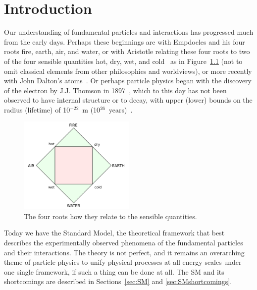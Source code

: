 
\chapter{Introduction\label{ch:intro}}

Our understanding of fundamental particles and interactions has progressed much from the early days.
Perhaps these beginnings are with Empdocles and his four roots fire, earth, air, and water, or with
Aristotle relating these four roots to two of the four sensible quantities hot, dry, wet, and
cold~\cite{0415078547} as in Figure~\ref{fig:aristotle}
(not to omit classical elements from other philosophies and worldviews), or more recently with
John Dalton's atoms~\cite{dalton}. Or perhaps particle physics began with
the discovery of the electron by J.J. Thomson in 1897~\cite{thomson:electron},
which to this day has not been observed
to have internal structure or to decay, with upper (lower) bounds on the radius (lifetime) of
10$^{-22}$~m (10$^{26}$~years)~\cite{1988PhST...22..102D,2002PhLB..525...29B}.

\begin{figure}[ht]
 \begin{center}
    \includegraphics[width=0.50\textwidth]{figures/intro/Four_elements_representation.png}
      \end{center}
\caption{The four roots how they relate to the sensible quantities.}
\label{fig:aristotle}
\end{figure}

Today we have the Standard Model, the theoretical framework that best describes the
experimentally observed phenomena of the fundamental particles and their interactions. The theory
is not perfect, and it remains an overarching theme of particle physics to unify physical processes
at all energy scales under one single framework, if such a thing can be done at all.
The SM and its shortcomings are described in
Sections~\ref{sec:SM} and \ref{sec:SMshortcomings}.

